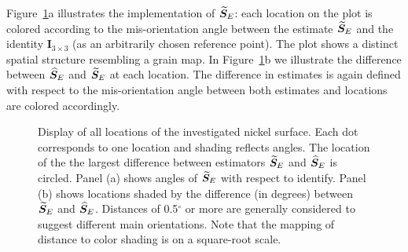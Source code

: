 Figure~\ref{fig:grain-map}a illustrates the implementation of ${\widetilde{\bm S}_E}$: each location on the plot is colored according to the mis-orientation angle between  the estimate ${\widetilde{\bm S}_E}$  and the identity $\bm I_{3\times 3}$ (as an arbitrarily chosen reference point).  The plot shows a distinct spatial structure resembling a grain map. In Figure~\ref{fig:grain-map}b we illustrate the difference between ${\widehat{\bm S}_E}$ and ${\widetilde{\bm S}_E}$ at each location. The difference in estimates is again defined with respect to the mis-orientation angle between both estimates and locations are colored accordingly. 
%
\begin{figure}[h!] %
   \centering
    \hfill
   \caption{ \label{fig:grain-map}  Display of all locations of the investigated nickel surface. Each dot corresponds to one location and shading reflects  angles. The location of the the largest difference between estimators ${\widetilde{\bm S}_E}$ and ${\widehat{\bm S}_E}$ is circled. Panel (a) shows angles of ${\widetilde{\bm S}_E}$ with respect to identify. Panel (b) shows locations shaded by the difference (in degrees) between ${\widetilde{\bm S}_E}$ and ${\widehat{\bm S}_E}$. Distances of 0.5$^\circ$ or more are generally considered to suggest different main orientations. Note that the mapping of distance to color shading is on a square-root scale.}
\end{figure}
